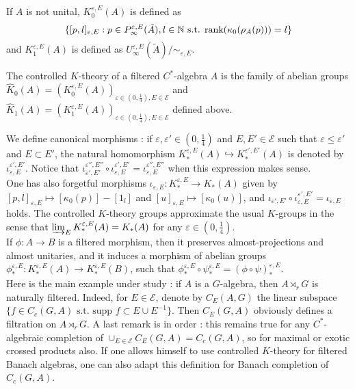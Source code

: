 If $A$ is not unital, $K_0^{\varepsilon,E}(A)$ is defined as
\[\{[p,l]_{\varepsilon,E} : p\in P^{\varepsilon,E}_\infty (\tilde A), l\in \mathbb N \text{ s.t. rank}(\kappa_0(\rho_A(p)))=l \}\]
and $K_1^{\varepsilon,E}(A)$ is defined as $U_\infty^{\varepsilon,E}(\tilde A)/ \sim_{\varepsilon,E}$.\\

\begin{definition}
The controlled $K$-theory of a filtered $C^*$-algebra $A$ is the family of abelian groups $\hat K_0(A) = (K_0^{\varepsilon,E}(A))_{\varepsilon\in (0,\frac{1}{4}),E\in\mathcal E}$ and $\hat K_1(A) = (K_1^{\varepsilon,E}(A))_{\varepsilon\in (0,\frac{1}{4}),E\in\mathcal E}$ defined above.\\
\end{definition}

We define canonical morphisms : if $\varepsilon, \varepsilon'\in (0,\frac{1}{4})$ and $E,E'\in\mathcal E$ such that $\varepsilon \leq \varepsilon'$ and $E \subset E'$, the natural homomorphism $K_*^{\varepsilon,E}(A)\hookrightarrow K_*^{\varepsilon',E'}(A)$ is denoted by $\iota_{\varepsilon,E}^{\varepsilon',E'}$. Notice that $\iota_{\varepsilon',E'}^{\varepsilon'',E''}\circ\iota_{\varepsilon,E}^{\varepsilon',E'}=\iota_{\varepsilon,E}^{\varepsilon'',E''}$ when this expression makes sense.\\

One has also forgetful morphisms $\iota_{\varepsilon,E} : K_*^{\varepsilon,E}\rightarrow K_*(A)$ given by $[p,l]_{\varepsilon,E} \mapsto [\kappa_0(p)]-[1_l]$ and $[u]_{\varepsilon,E} \mapsto [\kappa_0(u)] $, and 
$\iota_{\varepsilon',E'}\circ\iota_{\varepsilon,E}^{\varepsilon',E'}=\iota_{\varepsilon, E}$ holds. The controlled $K$-theory groups approximate the usual $K$-groups in the sense that $\varinjlim_{E} K_*^{\varepsilon,E}(A) = K_*(A)$ for any $\varepsilon\in (0,\frac{1}{4})$.\\

If $\phi : A\rightarrow B$ is a filtered morphism, then it preserves almost-projections and almost unitaries, and it induces a morphism of abelian groups $\phi_*^{\varepsilon,E} : K_*^{\varepsilon,E}(A) \rightarrow K_*^{\varepsilon,E}(B)$, such that $\phi_*^{\varepsilon,E} \circ \psi_*^{\varepsilon,E} = (\phi\circ\psi)_*^{\varepsilon,E}$.\\

Here is the main example under study : if $A$ is a $G$-algebra, then $A \rtimes_r G$ is naturally filtered. Indeed, for $E\in \mathcal{E}$, denote by $C_E(A,G)$ the linear subspace $\{ f \in C_c(G,A) \text{ s.t. supp }f\subset E\cup E^{-1} \}$. Then $C_E(G,A)$ obviously defines a filtration on $A\rtimes_r G$. A last remark is in order : this remains true for any $C^*$-algebraic completion of $\cup_{E\in\mathcal{E}} C_E(G,A) = C_c(G,A)$, so for maximal or exotic crossed products also. If one allows himself to use controlled $K$-theory for filtered Banach algebras, one can also adapt this definition for Banach completion of $C_c(G,A)$.

